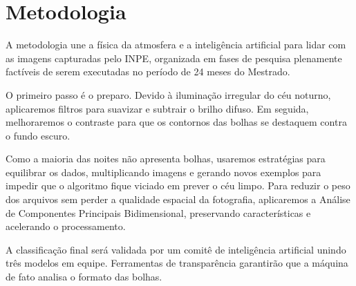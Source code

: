 \section{Metodologia}\label{sec:methodology}

A metodologia une a física da atmosfera e a inteligência artificial para lidar com as imagens capturadas pelo INPE, organizada em fases de pesquisa plenamente factíveis de serem executadas no período de 24 meses do Mestrado.

O primeiro passo é o preparo. Devido à iluminação irregular do céu noturno, aplicaremos filtros para suavizar e subtrair o brilho difuso. Em seguida, melhoraremos o contraste para que os contornos das bolhas se destaquem contra o fundo escuro.

Como a maioria das noites não apresenta bolhas, usaremos estratégias para equilibrar os dados, multiplicando imagens e gerando novos exemplos para impedir que o algoritmo fique viciado em prever o céu limpo. Para reduzir o peso dos arquivos sem perder a qualidade espacial da fotografia, aplicaremos a Análise de Componentes Principais Bidimensional, preservando características e acelerando o processamento.

A classificação final será validada por um comitê de inteligência artificial unindo três modelos em equipe. Ferramentas de transparência garantirão que a máquina de fato analisa o formato das bolhas.
